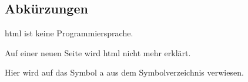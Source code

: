 \subsection{Abkürzungen}\label{subsec:abbrev}
	
\ac{html} ist keine Programmiersprache.
	
\newpage
	
Auf einer neuen Seite wird \ac{html} nicht mehr erklärt.

Hier wird auf das Symbol \ac{a} aus dem Symbolverzeichnis verwiesen.